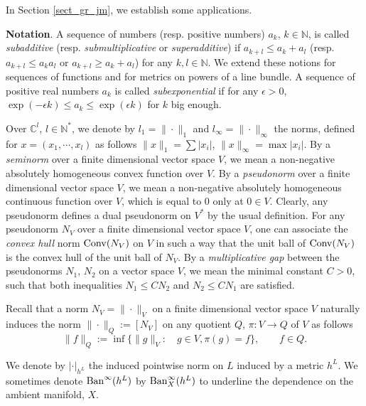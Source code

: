 \documentclass[12pt]{article}
\numberwithin{equation}{section}
\theoremstyle{theorem}
\theoremstyle{definition}
\theoremstyle{remark}
\newcommand{\comp}{\mathbb{C}}
\newcommand{\nat}{\mathbb{N}}
\newcommand{\Conv}[1]{{\rm{Conv}}{(#1)}}
\begin{document}
	In Section \ref{sect_gr_jm}, we establish some applications.
	\par 
	\textbf{Notation}. 
	A sequence of numbers (resp. positive numbers) $a_k$, $k \in \nat$, is called \textit{subadditive} (resp. \textit{submultiplicative} or \textit{superadditive}) if $a_{k + l} \leq a_k + a_l$ (resp. $a_{k + l} \leq a_k a_l$ or $a_{k + l} \geq a_k + a_l$) for any $k, l \in \nat$.
	We extend these notions for sequences of functions and for metrics on powers of a line bundle.
	A sequence of positive real numbers $a_k$ is called \textit{subexponential} if for any $\epsilon > 0$, $\exp(- \epsilon k) \leq a_k \leq \exp( \epsilon k)$ for $k$ big enough.
	\par 
	Over $\comp^l$, $l \in \nat^*$, we denote by $\textit{l}_1 = \| \cdot \|_1$ and $\textit{l}_{\infty}= \| \cdot \|_{\infty}$ the norms, defined for $x = (x_1, \cdots, x_l)$ as follows $\| x \|_1 = \sum |x_i|$, $\| x \|_{\infty} = \max |x_i|$.
	By a \textit{seminorm} over a finite dimensional vector space $V$, we mean a non-negative absolutely homogeneous convex function over $V$. 
	By a \textit{pseudonorm} over a finite dimensional vector space $V$, we mean a non-negative absolutely homogeneous continuous function over $V$, which is equal to $0$ only at $0 \in V$.
	Clearly, any pseudonorm defines a dual pseudonorm on $V^*$ by the usual definition. 
	For any pseudonorm $N_V$ over a finite dimensional vector space $V$, one can associate the \textit{convex hull} norm $\Conv{N_V}$ on $V$ in such a way that the unit ball of $\Conv{N_V}$ is the convex hull of the unit ball of $N_V$.
	By a \textit{multiplicative gap} between the pseudonorms $N_1$, $N_2$ on a vector space $V$, we mean the minimal constant $C > 0$, such that both inequalities $N_1 \leq C N_2$ and $N_2 \leq C N_1$ are satisfied.
	\par 
	Recall that a norm $N_V = \| \cdot \|_V$ on a finite dimensional vector space $V$ naturally induces the norm $\| \cdot \|_Q := [N_V]$ on any quotient $Q$, $\pi : V \to Q$ of $V$ as follows
	\begin{equation}\label{eq_defn_quot_norm}
		\| f \|_Q
		:=
		\inf \Big \{
		 \| g \|_V
		 :
		 \quad
		 g \in V, 
		 \pi(g) = f
		\Big\},
		\qquad f \in Q.
	\end{equation}
	\par 
	We denote by $| \cdot |_{h^L}$ the induced pointwise norm on $L$ induced by a metric $h^L$.
	We sometimes denote ${\rm{Ban}}^{\infty}(h^L)$ by ${\rm{Ban}}^{\infty}_{X}(h^L)$ to underline the dependence on the ambient manifold, $X$.
\end{document}
